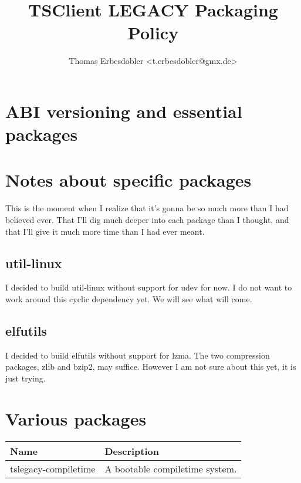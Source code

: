 \documentclass[a4paper]{article}
\title{TSClient LEGACY Packaging Policy}
\author{Thomas Erbesdobler <t.erbesdobler@gmx.de>}
\begin{document}
	\maketitle
	\tableofcontents

	\section{ABI versioning and essential packages}
	
	\section{Notes about specific packages}
	
	This is the moment when I realize that it's gonna be so much more than I had believed ever. That I'll dig much deeper into each package than I thought, and that I'll give it much more time than I had ever meant.
	
	\subsection{util-linux}
	
	I decided to build util-linux without support for udev for now. I do not want to work around this cyclic dependency yet. We will see what will come.
	
	\subsection{elfutils}
	
	I decided to build elfutils without support for lzma. The two compression packages, zlib and bzip2, may suffice. However I am not sure about this yet, it is just trying.
	
	\section{Various packages}
	
	\begin{tabularx}{\textwidth}{l|X}
		Name & Description \\
		\hline
		tslegacy-compiletime & A bootable compiletime system. \\
	\end{tabularx}
\end{document}

